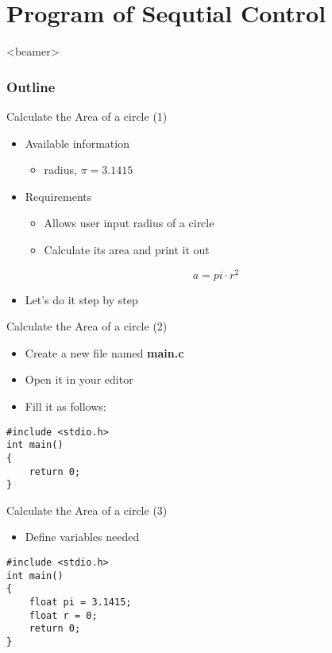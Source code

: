 \section{Program of Sequtial Control}
\begin{frame}<beamer>
    \frametitle{Outline}
    \tableofcontents[currentsection]
\end{frame}

\begin{frame}{Calculate the Area of a circle (1)}
\begin{itemize}
	\item {Available information}
	\begin{itemize}
		\item {radius, $\pi=3.1415$}
	\end{itemize}
	\item {Requirements}
	\begin{itemize}
		\item {Allows user input radius of a circle}
		\item {Calculate its area and print it out}
	\end{itemize}
	\begin{equation}
		a = pi\cdot r^2 \nonumber
	\end{equation}
\end{itemize}
\begin{itemize}
	\item {Let's do it step by step}
\end{itemize}
\end{frame}

\begin{frame}[fragile]{Calculate the Area of a circle (2)}
	\begin{itemize}
		\item {Create a new file named \textbf{main.c}}
		\item {Open it in your editor}
		\item {Fill it as follows:}
	\end{itemize}
\begin{center}
	\begin{lstlisting}[frame=non, xleftmargin=0.2\linewidth]
#include <stdio.h>
int main()
{
    return 0;
}
	\end{lstlisting}
\end{center}
\end{frame}

\begin{frame}[fragile]{Calculate the Area of a circle (3)}
	\begin{itemize}
		\item {Define variables needed}
	\end{itemize}
\begin{center}
	\begin{lstlisting}[frame=non, xleftmargin=0.2\linewidth]
#include <stdio.h>
int main()
{
    float pi = 3.1415;
    float r = 0;
    return 0;
}
	\end{lstlisting}
\end{center}
\end{frame}

